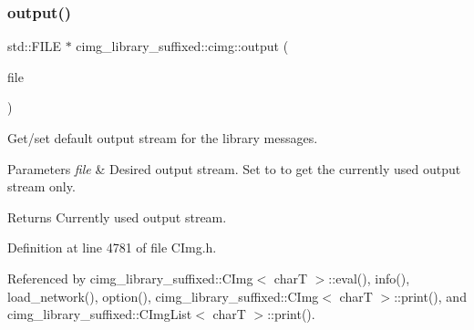 \subsubsection{\texorpdfstring{output()}{output()}}
{\footnotesize\ttfamily std\+::\+F\+I\+LE $\ast$ cimg\+\_\+library\+\_\+suffixed\+::cimg\+::output (\begin{DoxyParamCaption}\item[{std\+::\+F\+I\+LE $\ast$}]{file }\end{DoxyParamCaption})\hspace{0.3cm}{\ttfamily [inline]}}



Get/set default output stream for the  library messages. 


\begin{DoxyParams}{Parameters}
{\em file} & Desired output stream. Set to {} to get the currently used output stream only. \\
\hline
\end{DoxyParams}
\begin{DoxyReturn}{Returns}
Currently used output stream. 
\end{DoxyReturn}


Definition at line 4781 of file C\+Img.\+h.



Referenced by cimg\+\_\+library\+\_\+suffixed\+::\+C\+Img$<$ char\+T $>$\+::eval(), info(), load\+\_\+network(), option(), cimg\+\_\+library\+\_\+suffixed\+::\+C\+Img$<$ char\+T $>$\+::print(), and cimg\+\_\+library\+\_\+suffixed\+::\+C\+Img\+List$<$ char\+T $>$\+::print().

